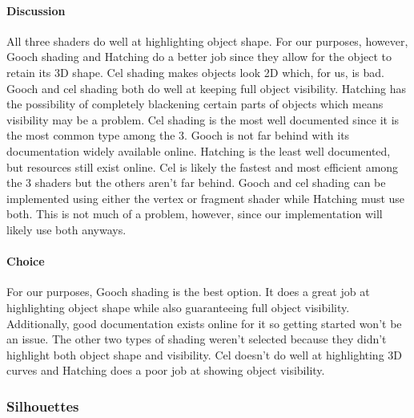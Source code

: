 \paragraph{Discussion}
All three shaders do well at highlighting object shape. 
For our purposes, however, Gooch shading and Hatching do a better job since they allow for the object to retain its 3D shape. 
Cel shading makes objects look 2D which, for us, is bad.
Gooch and cel shading both do well at keeping full object visibility. 
Hatching has the possibility of completely blackening certain parts of objects which means visibility may be a problem.
Cel shading is the most well documented since it is the most common type among the 3. 
Gooch is not far behind with its documentation widely available online.
Hatching is the least well documented, but resources still exist online.
Cel is likely the fastest and most efficient among the 3 shaders but the others aren't far behind.
Gooch and cel shading can be implemented using either the vertex or fragment shader while Hatching must use both.
This is not much of a problem, however, since our implementation will likely use both anyways.

\paragraph{Choice}
For our purposes, Gooch shading is the best option. 
It does a great job at highlighting object shape while also guaranteeing full object visibility. 
Additionally, good documentation exists online for it so getting started won't be an issue.
The other two types of shading weren't selected because they didn't highlight both object shape and visibility.
Cel doesn't do well at highlighting 3D curves and Hatching does a poor job at showing object visibility.

\newpage

\subsubsection{Silhouettes}

